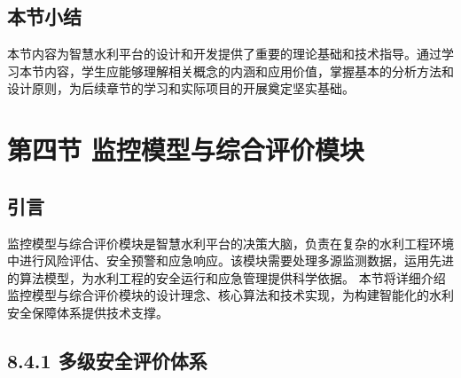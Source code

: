 \subsection{本节小结}\label{ux672cux8282ux5c0fux7ed3-1}
本节内容为智慧水利平台的设计和开发提供了重要的理论基础和技术指导。通过学习本节内容，学生应能够理解相关概念的内涵和应用价值，掌握基本的分析方法和设计原则，为后续章节的学习和实际项目的开展奠定坚实基础。 \section{第四节
监控模型与综合评价模块}\label{ux7b2cux56dbux8282-ux76d1ux63a7ux6a21ux578bux4e0eux7efcux5408ux8bc4ux4ef7ux6a21ux5757}
\subsection{引言}\label{ux5f15ux8a00-3}
监控模型与综合评价模块是智慧水利平台的决策大脑，负责在复杂的水利工程环境中进行风险评估、安全预警和应急响应。该模块需要处理多源监测数据，运用先进的算法模型，为水利工程的安全运行和应急管理提供科学依据。
本节将详细介绍监控模型与综合评价模块的设计理念、核心算法和技术实现，为构建智能化的水利安全保障体系提供技术支撑。 \subsection{8.4.1
多级安全评价体系}\label{ux591aux7ea7ux5b89ux5168ux8bc4ux4ef7ux4f53ux7cfb}
